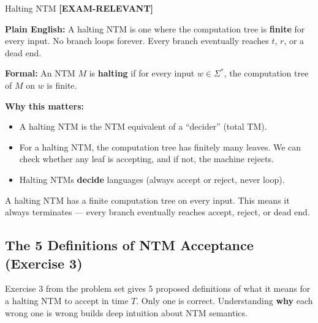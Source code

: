 \documentclass[11pt,a4paper]{article}
\newcommand{\kemark}{\textcolor{red!70!black}{\textbf{[EXAM-RELEVANT]}}}
\newcommand{\kt}[1]{\par\vspace{0.3em}\colorbox{yellow!60}{\parbox{\dimexpr\linewidth-2\fboxsep}{#1}}\vspace{0.3em}}
\begin{document}
\begin{definitionbox}{Halting NTM \kemark}

\textbf{Plain English:}
A halting NTM is one where the computation tree is \textbf{finite} for every input. No branch loops forever. Every branch eventually reaches $t$, $r$, or a dead end.

\textbf{Formal:}
An NTM $M$ is \textbf{halting} if for every input $w \in \Sigma^*$, the computation tree of $M$ on $w$ is finite.

\textbf{Why this matters:}
\begin{itemize}[nosep]
\item A halting NTM is the NTM equivalent of a ``decider'' (total TM).
\item For a halting NTM, the computation tree has finitely many leaves. We can check whether any leaf is accepting, and if not, the machine rejects.
\item Halting NTMs \textbf{decide} languages (always accept or reject, never loop).
\end{itemize}

\kt{A halting NTM has a finite computation tree on every input. This means it always terminates --- every branch eventually reaches accept, reject, or dead end.}
\end{definitionbox}

\subsection{The 5 Definitions of NTM Acceptance (Exercise 3)}

Exercise 3 from the problem set gives 5 proposed definitions of what it means for a halting NTM to accept in time $T$. Only one is correct. Understanding \textbf{why} each wrong one is wrong builds deep intuition about NTM semantics.
\end{document}
